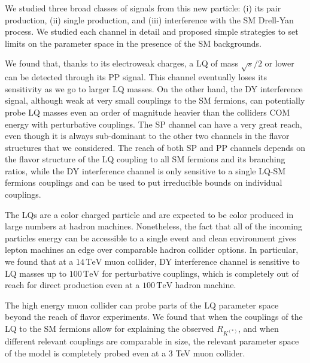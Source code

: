 \documentclass[a4paper,11pt]{article}
\begin{document}
We studied three broad classes of signals from this new particle: (i) its pair production, (ii) single production, and (iii) interference with the SM Drell-Yan process. We studied each channel in detail and proposed simple strategies to set limits on the parameter space in the presence of the SM backgrounds.



We found that, thanks to its electroweak charges, a LQ of mass $\sqrt{s}/2$ or lower can be detected through its PP signal. 
This channel eventually loses its sensitivity as we go to larger LQ masses. 
On the other hand, the DY interference signal, although weak at very small couplings to the SM fermions, can potentially probe LQ masses even an order of magnitude heavier than the colliders COM energy with perturbative couplings. 
The SP channel can have a very great reach, even though it is always sub-dominant to the other two channels in the flavor structures that we considered. 
The reach of both SP and PP channels depends on the flavor structure of the LQ coupling to all SM fermions and its branching ratios, while the DY interference channel is only sensitive to a single LQ-SM fermions couplings and can be used to put irreducible bounds on individual couplings.

The LQs are a color charged particle and are expected to be color produced in large numbers at hadron machines. 
Nonetheless, the fact that all of the incoming particles energy can be accessible to a single event and clean environment gives lepton machines an edge over comparable hadron collider options. 
In particular, we found that at a $14\,\textrm{TeV}$ muon collider, DY interference channel is sensitive to LQ masses up to $100\,\textrm{TeV}$ for perturbative couplings, which is completely out of reach for direct production even at a $100\,\textrm{TeV}$ hadron machine.


The high energy muon collider can probe parts of the LQ parameter space beyond the reach of flavor experiments. We found that when the couplings of the LQ to the SM fermions allow for explaining the observed $R_{K^{(*)}}$, and when different relevant couplings are comparable in size, the relevant parameter space of the model is completely probed even at a 3 TeV muon collider. 
\end{document}
